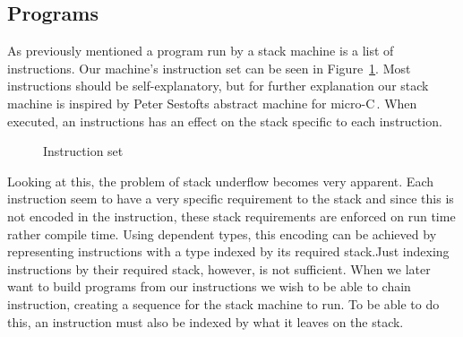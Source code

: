 \subsection{Programs}
\label{sec:program}
As previously mentioned a program run by a stack machine is a list of instructions. Our machine's instruction set can be seen in Figure~\ref{fig:inst_set}. Most instructions should be self-explanatory, but for further explanation our stack machine is inspired by Peter Sestofts abstract machine for micro-C\,\cite[pp. 157-161]{Sestoft:PLC}. When executed, an instructions has an effect on the stack specific to each instruction.

\begin{figure}
\caption{Instruction set}
\label{fig:inst_set}
\end{figure}

Looking at this, the problem of stack underflow becomes very apparent. Each instruction seem to have a very specific requirement to the stack and since this is not encoded in the instruction, these stack requirements are enforced on run time rather compile time. Using dependent types, this encoding can be achieved by representing instructions with a type indexed by its required stack.Just indexing instructions by their required stack, however, is not sufficient. When we later want to build programs from our instructions we wish to be able to chain instruction, creating a sequence for the stack machine to run. To be able to do this, an instruction must also be indexed by what it leaves on the stack. 

